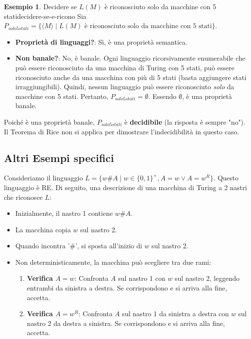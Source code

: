 \documentclass[a4paper]{article}
\theoremstyle{definition} %
\newtheorem{example}[theorem]{Esempio}
\begin{document}
\begin{example}{Decidere se $L(M)$ è riconosciuto solo da macchine con 5 stati}{decidere-se-e-ricono}
Sia $P_{solo5stati} = \{\langle M \rangle \mid L(M) \text{ è riconosciuto solo da macchine con 5 stati}\}$.
\begin{itemize}
    \item \textbf{Proprietà di linguaggi?}: Sì, è una proprietà semantica.
    \item \textbf{Non banale?}: No, è banale. Ogni linguaggio ricorsivamente enumerabile che può essere riconosciuto da una macchina di Turing con 5 stati, può essere riconosciuto anche da una macchina con più di 5 stati (basta aggiungere stati irraggiungibili). Quindi, nessun linguaggio può essere riconosciuto \emph{solo} da macchine con 5 stati. Pertanto, $P_{solo5stati} = \emptyset$. Essendo $\emptyset$, è una proprietà banale.
\end{itemize}
Poiché è una proprietà banale, $P_{solo5stati}$ è \textbf{decidibile} (la risposta è sempre "no"). Il Teorema di Rice non si applica per dimostrare l'indecidibilità in questo caso.
\end{example}

\subsection{Altri Esempi specifici}

Consideriamo il linguaggio $L = \{w\#A \mid w \in \{0,1\}^+, A=w \lor A=w^R \}$. Questo linguaggio è RE. Di seguito, una descrizione di una macchina di Turing a 2 nastri che riconosce $L$:
\begin{itemize}
    \item Inizialmente, il nastro 1 contiene $w\#A$.
    \item La macchina copia $w$ sul nastro 2.
    \item Quando incontra '\#', si sposta all'inizio di $w$ sul nastro 2.
    \item Non deterministicamente, la macchina può scegliere tra due rami:
        \begin{enumerate}
            \item \textbf{Verifica $A=w$}: Confronta $A$ sul nastro 1 con $w$ sul nastro 2, leggendo entrambi da sinistra a destra. Se corrispondono e si arriva alla fine, accetta.
            \item \textbf{Verifica $A=w^R$}: Confronta $A$ sul nastro 1 da sinistra a destra con $w$ sul nastro 2 da destra a sinistra. Se corrispondono e si arriva alla fine, accetta.
        \end{enumerate}
\end{itemize}
\end{document}
